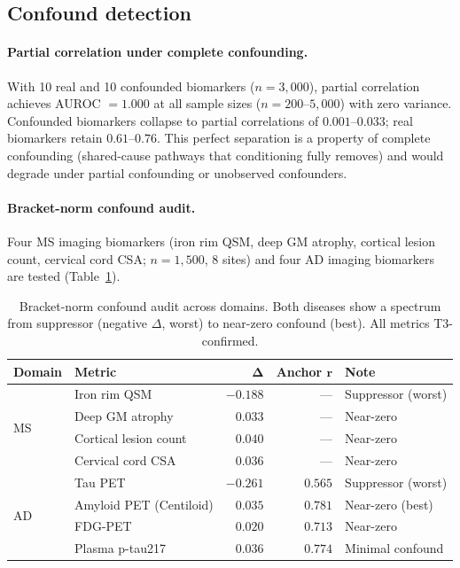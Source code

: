 \documentclass[11pt]{article}
\begin{document}
\subsection{Confound detection}
\label{sec:res-confound}

\paragraph{Partial correlation under complete confounding.}
With 10 real and 10 confounded biomarkers ($n = 3{,}000$), partial correlation achieves AUROC $= 1.000$ at all sample sizes ($n = 200$--$5{,}000$) with zero variance.
Confounded biomarkers collapse to partial correlations of $0.001$--$0.033$; real biomarkers retain $0.61$--$0.76$.
This perfect separation is a property of complete confounding (shared-cause pathways that conditioning fully removes) and would degrade under partial confounding or unobserved confounders.

\paragraph{Bracket-norm confound audit.}
Four MS imaging biomarkers (iron rim QSM, deep GM atrophy, cortical lesion count, cervical cord CSA; $n = 1{,}500$, 8 sites) and four AD imaging biomarkers are tested (Table~\ref{tab:p1-cross}).

\begin{table}[t]
\centering
\caption{Bracket-norm confound audit across domains. Both diseases show a spectrum from suppressor (negative $\Delta$, worst) to near-zero confound (best). All metrics T3-confirmed.}
\label{tab:p1-cross}
\small
\begin{tabular}{@{}llrrl@{}}
\toprule
\textbf{Domain} & \textbf{Metric} & $\boldsymbol{\Delta}$ & \textbf{Anchor} $\boldsymbol{r}$ & \textbf{Note} \\
\midrule
\multirow{4}{*}{MS}
& Iron rim QSM & $-0.188$ & --- & Suppressor (worst) \\
& Deep GM atrophy & $0.033$ & --- & Near-zero \\
& Cortical lesion count & $0.040$ & --- & Near-zero \\
& Cervical cord CSA & $0.036$ & --- & Near-zero \\
\midrule
\multirow{4}{*}{AD}
& Tau PET & $-0.261$ & $0.565$ & Suppressor (worst) \\
& Amyloid PET (Centiloid) & $0.035$ & $0.781$ & Near-zero (best) \\
& FDG-PET & $0.020$ & $0.713$ & Near-zero \\
& Plasma p-tau217 & $0.036$ & $0.774$ & Minimal confound \\
\bottomrule
\end{tabular}
\end{table}
\end{document}
